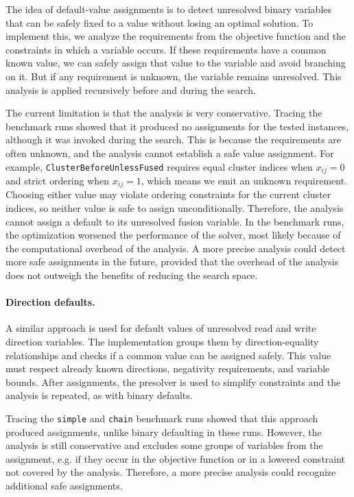 The idea of default-value assignments is to detect unresolved binary variables that can be safely fixed to a value without losing an optimal solution.
To implement this, we analyze the requirements from the objective function and the constraints in which a variable occurs.
If these requirements have a common known value, we can safely assign that value to the variable and avoid branching on it.
But if any requirement is unknown, the variable remains unresolved.
This analysis is applied recursively before and during the search.

The current limitation is that the analysis is very conservative.
Tracing the benchmark runs showed that it produced no assignments for the tested instances, although it was invoked during the search.
This is because the requirements are often unknown, and the analysis cannot establish a safe value assignment.
For example, \texttt{ClusterBeforeUnlessFused} requires equal cluster indices when $x_{ij} = 0$ and strict ordering when $x_{ij} = 1$, which means we emit an unknown requirement.
Choosing either value may violate ordering constraints for the current cluster indices, so neither value is safe to assign unconditionally.
Therefore, the analysis cannot assign a default to its unresolved fusion variable.
In the benchmark runs, the optimization worsened the performance of the solver, most likely because of the computational overhead of the analysis.
A more precise analysis could detect more safe assignments in the future, provided that the overhead of the analysis does not outweigh the benefits of reducing the search space.

\paragraph{Direction defaults.}

A similar approach is used for default values of unresolved read and write direction variables.
The implementation groups them by direction-equality relationships and checks if a common value can be assigned safely.
This value must respect already known directions, negativity requirements, and variable bounds.
After assignments, the presolver is used to simplify constraints and the analysis is repeated, as with binary defaults.

Tracing the \texttt{simple} and \texttt{chain} benchmark runs showed that this approach produced assignments, unlike binary defaulting in these runs.
However, the analysis is still conservative and excludes some groups of variables from the assignment, e.g. if they occur in the objective function or in a lowered constraint not covered by the analysis.
Therefore, a more precise analysis could recognize additional safe assignments.

